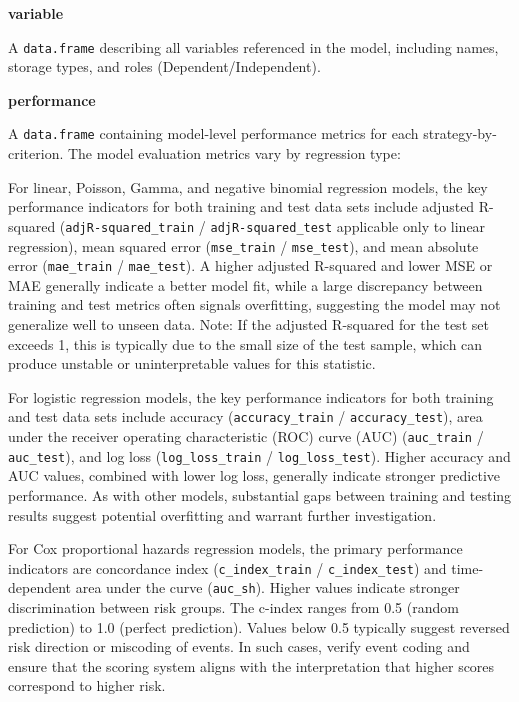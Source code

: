\textbf{variable}

A \texttt{data.frame} describing all variables referenced in the model, including names, storage types, and roles (Dependent/Independent).

\textbf{performance}

A \texttt{data.frame} containing model-level performance metrics for each strategy-by-criterion. The model evaluation metrics vary by regression type:

For linear, Poisson, Gamma, and negative binomial regression models, the key performance indicators for both training and test data sets include adjusted R-squared (\texttt{adjR-squared\_train} / \texttt{adjR-squared\_test} applicable only to linear regression), mean squared error (\texttt{mse\_train} / \texttt{mse\_test}), and mean absolute error (\texttt{mae\_train} / \texttt{mae\_test}). A higher adjusted R-squared and lower MSE or MAE generally indicate a better model fit, while a large discrepancy between training and test metrics often signals overfitting, suggesting the model may not generalize well to unseen data. Note: If the adjusted R-squared for the test set exceeds 1, this is typically due to the small size of the test sample, which can produce unstable or uninterpretable values for this statistic.

For logistic regression models, the key performance indicators for both training and test data sets include accuracy (\texttt{accuracy\_train} / \texttt{accuracy\_test}), area under the receiver operating characteristic (ROC) curve (AUC) (\texttt{auc\_train} / \texttt{auc\_test}), and log loss (\texttt{log\_loss\_train} / \texttt{log\_loss\_test}). Higher accuracy and AUC values, combined with lower log loss, generally indicate stronger predictive performance. As with other models, substantial gaps between training and testing results suggest potential overfitting and warrant further investigation.

For Cox proportional hazards regression models, the primary performance indicators are concordance index (\texttt{c\_index\_train} / \texttt{c\_index\_test}) and time-dependent area under the curve (\texttt{auc\_sh}). Higher values indicate stronger discrimination between risk groups. The c-index ranges from 0.5 (random prediction) to 1.0 (perfect prediction). Values below 0.5 typically suggest reversed risk direction or miscoding of events. In such cases, verify event coding and ensure that the scoring system aligns with the interpretation that higher scores correspond to higher risk.

